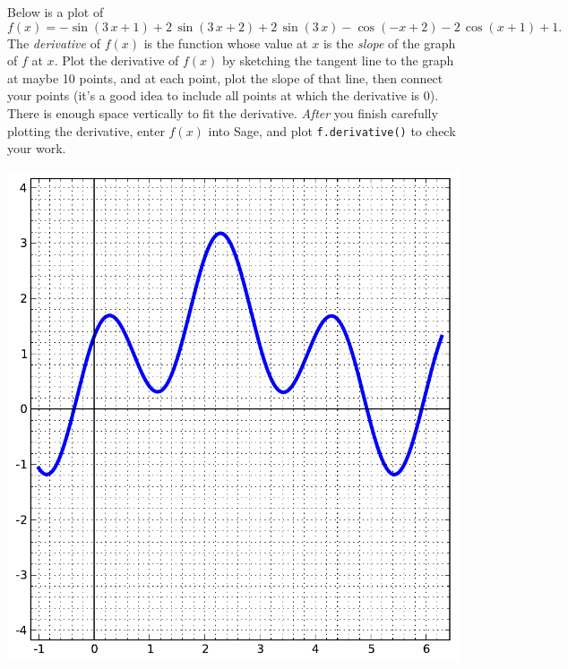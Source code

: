 Below is a plot of $$f(x)=-\sin\left(3 \, x + 1\right) + 2 \, \sin\left(3 \, x + 2\right) + 2 \, \sin\left(3 \, x\right) - \cos\left(-x + 2\right) - 2 \, \cos\left(x + 1\right) + 1.$$  The {\em \color{red}derivative} of $f(x)$ is the function whose value at $x$ is the {\em slope} of the graph of $f$ at $x$.  Plot the derivative of $f(x)$ by sketching the tangent line to the graph at maybe 10 points, and at each point, plot the slope of that line, then connect your points (it's a good idea to include all points at which the derivative is 0).  There is enough space vertically to fit the derivative.  {\em After} you finish carefully plotting the derivative, enter $f(x)$ into Sage, and plot {\color{blue}\verb|f.derivative()|} to check your work.
\begin{center}\includegraphics{functions/39.pdf}\end{center}\newpage

